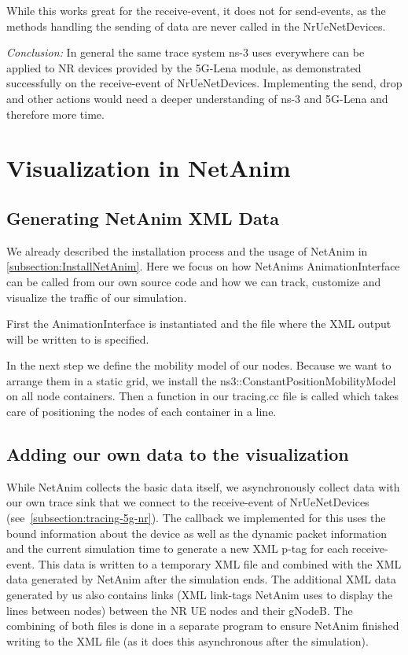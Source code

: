 While this works great for the receive-event, it does not for send-events, as the methods handling the sending of data are never called in the NrUeNetDevices.

\textit{Conclusion:} In general the same trace system ns-3 uses everywhere can be applied to NR devices provided by the 5G-Lena module, as demonstrated successfully on the receive-event of NrUeNetDevices. Implementing the send, drop and other actions would need a deeper understanding of ns-3 and 5G-Lena and therefore more time.

\section{Visualization in NetAnim}
\subsection{Generating NetAnim XML Data}
We already described the installation process and the usage of NetAnim in \ref{subsection:InstallNetAnim}. Here we focus on how NetAnims AnimationInterface can be called from our own source code and how we can track, customize and visualize the traffic of our simulation.

First the AnimationInterface is instantiated and the file where the XML output will be written to is specified.

In the next step we define the mobility model of our nodes. Because we want to arrange them in a static grid, we install the ns3::ConstantPositionMobilityModel on all node containers. Then a function in our tracing.cc file is called which takes care of positioning the nodes of each container in a line.
\subsection{Adding our own data to the visualization}
While NetAnim collects the basic data itself, we asynchronously collect data with our own trace sink that we connect to the receive-event of NrUeNetDevices (see~\ref{subsection:tracing-5g-nr}). The callback we implemented for this uses the bound information about the device as well as the dynamic packet information and the current simulation time to generate a new XML p-tag for each receive-event. This data is written to a temporary XML file and combined with the XML data generated by NetAnim after the simulation ends. The additional XML data generated by us also contains links (XML link-tags NetAnim uses to display the lines between nodes) between the NR UE nodes and their gNodeB. The combining of both files is done in a separate program to ensure NetAnim finished writing to the XML file (as it does this asynchronous after the simulation).






